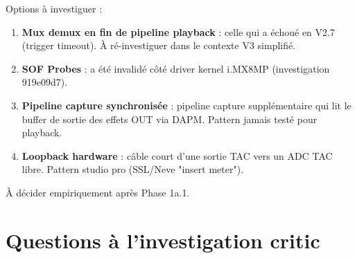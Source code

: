 \documentclass[11pt,a4paper]{article}
\begin{document}
Options à investiguer :
\begin{enumerate}[leftmargin=*, itemsep=1pt]
  \item \textbf{Mux demux en fin de pipeline playback} : celle qui a échoué en V2.7 (trigger timeout). À ré-investiguer dans le contexte V3 simplifié.
  \item \textbf{SOF Probes} : a été invalidé côté driver kernel i.MX8MP (investigation 919e09d7).
  \item \textbf{Pipeline capture synchronisée} : pipeline capture supplémentaire qui lit le buffer de sortie des effets OUT via DAPM. Pattern jamais testé pour playback.
  \item \textbf{Loopback hardware} : câble court d'une sortie TAC vers un ADC TAC libre. Pattern studio pro (SSL/Neve "insert meter").
\end{enumerate}

À décider empiriquement après Phase 1a.1.

\section{Questions à l'investigation critic}
\end{document}
